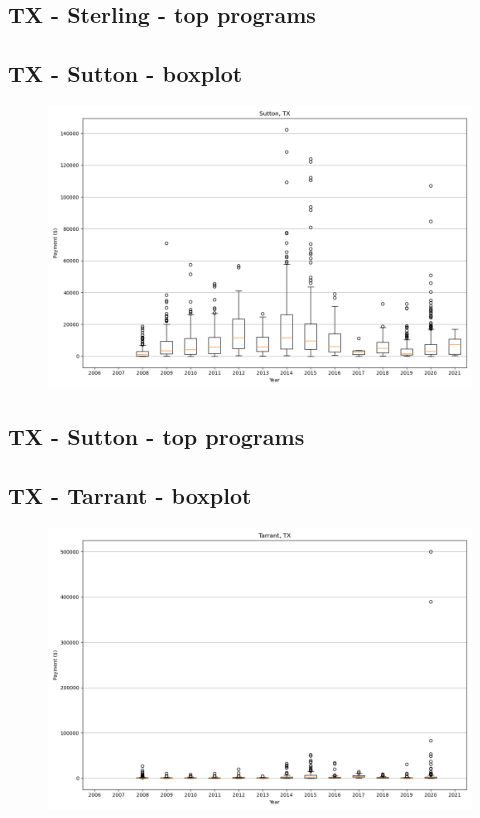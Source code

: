 \subsection*{TX - Sterling - top programs}

\newpage
\subsection*{TX - Sutton - boxplot}
\begin{figure}[h]
\centering
\includegraphics[width=7in]{../output/boxplots/counties/Sutton-TX_boxplot.png}
\end{figure}


\subsection*{TX - Sutton - top programs}

\newpage
\subsection*{TX - Tarrant - boxplot}
\begin{figure}[h]
\centering
\includegraphics[width=7in]{../output/boxplots/counties/Tarrant-TX_boxplot.png}
\end{figure}


